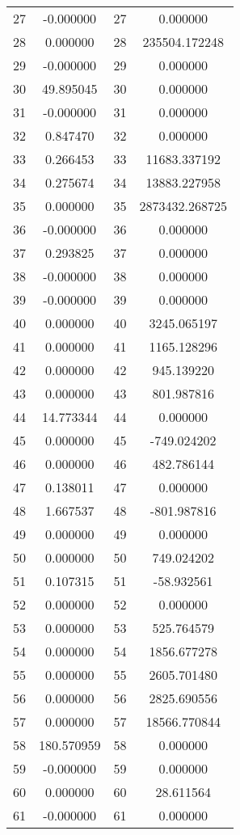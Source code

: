 \documentclass[12pt]{article}
\begin{document}
\begin{longtable}{@{}cccc@{}}
27 & -0.000000 & 27 & 0.000000 \\
28 & 0.000000 & 28 & 235504.172248 \\
29 & -0.000000 & 29 & 0.000000 \\
30 & 49.895045 & 30 & 0.000000 \\
31 & -0.000000 & 31 & 0.000000 \\
32 & 0.847470 & 32 & 0.000000 \\
33 & 0.266453 & 33 & 11683.337192 \\
34 & 0.275674 & 34 & 13883.227958 \\
35 & 0.000000 & 35 & 2873432.268725 \\
36 & -0.000000 & 36 & 0.000000 \\
37 & 0.293825 & 37 & 0.000000 \\
38 & -0.000000 & 38 & 0.000000 \\
39 & -0.000000 & 39 & 0.000000 \\
40 & 0.000000 & 40 & 3245.065197 \\
41 & 0.000000 & 41 & 1165.128296 \\
42 & 0.000000 & 42 & 945.139220 \\
43 & 0.000000 & 43 & 801.987816 \\
44 & 14.773344 & 44 & 0.000000 \\
45 & 0.000000 & 45 & -749.024202 \\
46 & 0.000000 & 46 & 482.786144 \\
47 & 0.138011 & 47 & 0.000000 \\
48 & 1.667537 & 48 & -801.987816 \\
49 & 0.000000 & 49 & 0.000000 \\
50 & 0.000000 & 50 & 749.024202 \\
51 & 0.107315 & 51 & -58.932561 \\
52 & 0.000000 & 52 & 0.000000 \\
53 & 0.000000 & 53 & 525.764579 \\
54 & 0.000000 & 54 & 1856.677278 \\
55 & 0.000000 & 55 & 2605.701480 \\
56 & 0.000000 & 56 & 2825.690556 \\
57 & 0.000000 & 57 & 18566.770844 \\
58 & 180.570959 & 58 & 0.000000 \\
59 & -0.000000 & 59 & 0.000000 \\
60 & 0.000000 & 60 & 28.611564 \\
61 & -0.000000 & 61 & 0.000000 \\

\end{longtable}
\end{document}
